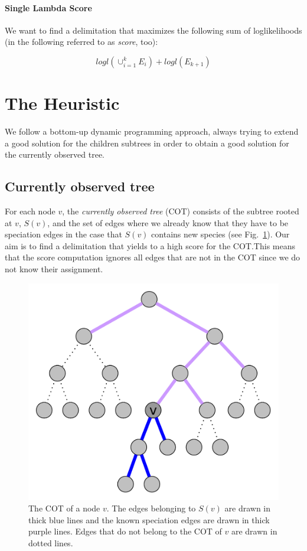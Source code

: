 \documentclass{llncs}
\begin{document}
\paragraph{Single Lambda Score}

We want to find a delimitation that maximizes the following sum of loglikelihoods (in the following referred to as \emph{score}, too):

$$logl(\cup_{i=1}^k{E_i}) + logl(E_{k+1})$$

\section{The Heuristic}
We follow a bottom-up dynamic programming approach, always trying to extend a good solution for the children subtrees in order to obtain a good solution for the currently observed tree.

\subsection{Currently observed tree}

For each node $v$, the \emph{currently observed tree} (COT) consists of the subtree rooted at $v$, $S(v)$, and the set of edges where we already know that they have to be speciation edges in the case that $S(v)$ contains new species (see Fig.~\ref{fig:currently_observed_tree}). Our aim is to find a delimitation that yields to a high score for the COT.\@ This means that the score computation ignores all edges that are not in the COT since we do not know their assignment.

\begin{figure}[h!]
	\centering
	\includegraphics[scale=0.4]{images/currently_observed_tree.pdf}
	\caption{The COT of a node $v$. The edges belonging to $S(v)$ are drawn in thick blue lines and the known speciation edges are drawn in thick purple lines. Edges that do not belong to the COT of $v$ are drawn in dotted lines.}
	\label{fig:currently_observed_tree}
\end{figure}
\end{document}
